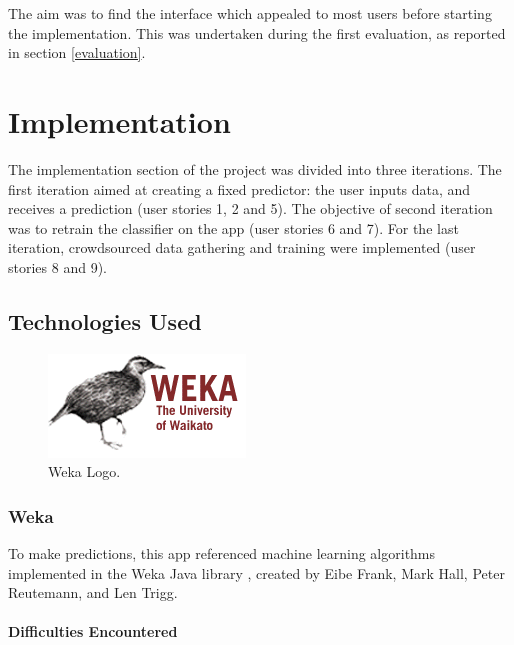 \documentclass{mproj}
\begin{document}
The aim was to find the interface which appealed to most users before starting the implementation. This was undertaken during the first evaluation, as reported in section \ref{evaluation}.


\chapter{Implementation}\label{implementation}

The implementation section of the project was divided into three iterations. 
The first iteration aimed at creating a fixed predictor: the user inputs data, and receives a prediction (user stories 1, 2 and 5). 
The objective of second iteration was to retrain the classifier on the app (user stories 6 and 7). 
For the last iteration, crowdsourced data gathering and training were implemented (user stories 8 and 9). \par

\section{Technologies Used}

\begin{figure}
	\vspace{-10pt}
	\centering
	\includegraphics[scale=0.60]{images/weka_logo}
	\caption{Weka Logo.}
	\vspace{-30pt}
\end{figure}

\subsection{Weka}


To make predictions, this app referenced machine learning algorithms implemented in the Weka Java library \cite{weka}, created by Eibe Frank, Mark Hall, Peter Reutemann, and Len Trigg. 

\subsubsection*{Difficulties Encountered}
\end{document}
